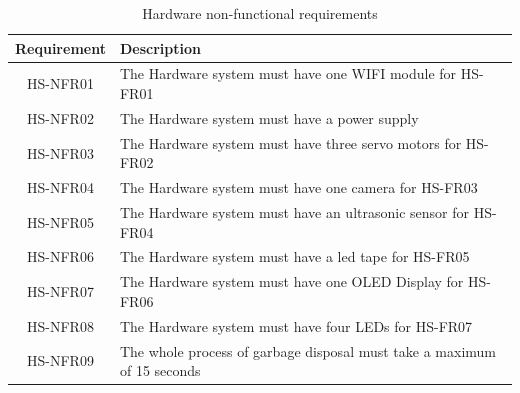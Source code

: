 \documentclass[a4paper,11pt]{article}
\begin{document}
\begin{table}[H]
  \caption{\small{Hardware non-functional requirements}}
  \begin{center}
    \begin{tabular}{|c|p{95mm}|}
      \hline
      Requirement & Description                                                             \\ \hline
      HS-NFR01    & The Hardware system must have one WIFI module for HS-FR01               \\ \hline
      HS-NFR02    & The Hardware system must have a power supply                            \\ \hline
      HS-NFR03    & The Hardware system must have three servo motors for HS-FR02            \\ \hline
      HS-NFR04    & The Hardware system must have one camera for HS-FR03                    \\ \hline
      HS-NFR05    & The Hardware system must have an ultrasonic sensor for HS-FR04          \\ \hline
      HS-NFR06    & The Hardware system must have a led tape for HS-FR05                    \\ \hline
      HS-NFR07    & The Hardware system must have one OLED Display for HS-FR06              \\ \hline
      HS-NFR08    & The Hardware system must have four LEDs for HS-FR07                     \\ \hline
      HS-NFR09    & The whole process of garbage disposal must take a maximum of 15 seconds \\ \hline
    \end{tabular}
  \end{center}
  \label{tab:hardware1}
\end{table}
\end{document}

